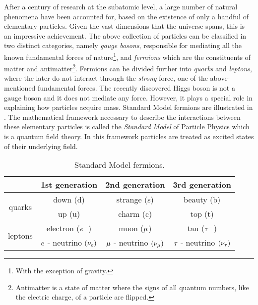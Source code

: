 After a century of research at the subatomic level, a large number of natural phenomena have been accounted
for, based on the existence of only a handful of elementary particles. Given the vast dimensions that the
universe spans, this is an impressive achievement. The above collection of particles can be classified
in two distinct categories, namely {\it gauge bosons}, responsible for mediating all the known fundamental
forces of nature\footnote{With the exception of gravity.}, and {\it fermions} which are the constituents
of matter and antimatter\footnote{Antimatter is a state of matter where the signs of all quantum numbers,
like the electric charge, of a particle are flipped.}. Fermions can be divided further into {\it quarks}
and {\it leptons}, where the later do not interact through the {\it strong} force, one of the above-mentioned
fundamental forces. The recently discovered Higgs boson \cite{higgs-cms,higgs-atlas} is not a gauge boson and
it does not mediate any force. However, it plays a special role in explaining how particles acquire mass.
Standard Model fermions are illustrated in . The mathematical framework necessary to
describe the interactions between these elementary particles is called the \textit{Standard Model} of Particle
Physics \cite{sm-glashow,sm-weinberg,sm-salam} which is a quantum field theory. In this framework particles are
treated as excited states of their underlying field.


\begin{table}[h!]
  \centering
 \begin{tabular}{cccc}
   \hline
                            &  1st generation                     &   2nd generation              &  3rd generation    \\
   \hline
   \multirow{2}{*}{quarks}  &  down (d)                           &   strange (s)                 &  beauty (b)        \\
                            &  up (u)                             &   charm (c)                   &  top (t)           \\
   \hline
   \multirow{2}{*}{leptons} &   electron ($e^-$)                  &   muon ($\mu$)               &  tau ($\tau^-$)     \\
                            &   $e$ - neutrino $(\nu_e)$  &  $\mu$ - neutrino $(\nu_\mu)$  &  $\tau$ - neutrino $(\nu_\tau)$  \\
   \hline
 \end{tabular}
 \caption{Standard Model fermions.}
 \label{quarksLeptons}
\end{table}

